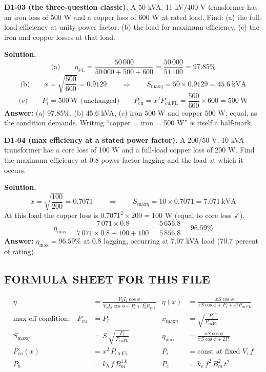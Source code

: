 \documentclass[11pt]{article}
\newcommand{\tagline}[1]{\textbf{\color{copper}#1}}
\begin{document}
\vspace{2pt}

\tagline{D1-03 (the three-question classic).} A 50 kVA, 11 kV/400 V transformer has an iron loss of 500 W and a copper loss of 600 W at rated load. Find: (a) the full-load efficiency at unity power factor, (b) the load for maximum efficiency, (c) the iron and copper losses at that load.

\textbf{Solution.}
\[
\text{(a)}\qquad
\eta_{\text{FL}} = \frac{50\,000}{50\,000 + 500 + 600} = \frac{50\,000}{51\,100} = 97.85\%
\]
\[
\text{(b)}\qquad
x = \sqrt{\frac{500}{600}} = 0.9129
\qquad\Longrightarrow\qquad
S_{\text{max}\eta} = 50 \times 0.9129 = 45.6\ \text{kVA}
\]
\[
\text{(c)}\qquad
P_i = 500\ \text{W (unchanged)}
\qquad
P_{\text{cu}} = x^{2} P_{\text{cu,FL}} = \frac{500}{600} \times 600 = 500\ \text{W}
\]
\textbf{Answer:} (a) 97.85\%, (b) 45.6 kVA, (c) iron 500 W and copper 500 W: equal, as the condition demands. Writing ``copper = iron = 500 W'' is itself a half-mark.

\vspace{2pt}

\tagline{D1-04 (max efficiency at a stated power factor).} A 200/50 V, 10 kVA transformer has a core loss of 100 W and a full-load copper loss of 200 W. Find the maximum efficiency at 0.8 power factor lagging and the load at which it occurs.

\textbf{Solution.}
\[
x = \sqrt{\frac{100}{200}} = 0.7071
\qquad\Longrightarrow\qquad
S_{\text{max}\eta} = 10 \times 0.7071 = 7.071\ \text{kVA}
\]
At this load the copper loss is $0.7071^{2} \times 200 = 100$ W (equal to core loss $\checkmark$).
\[
\eta_{\text{max}} = \frac{7\,071 \times 0.8}{7\,071 \times 0.8 + 100 + 100} = \frac{5\,656.8}{5\,856.8} = 96.59\%
\]
\textbf{Answer:} $\eta_{\text{max}} = 96.59\%$ at 0.8 lagging, occurring at 7.07 kVA load (70.7 percent of rating).

\hrulefill
\subsection*{\color{copper}FORMULA SHEET FOR THIS FILE}
\begin{align*}
\eta &= \frac{V_2 I_2 \cos\phi}{V_2 I_2 \cos\phi + P_i + I_2^{2} R_{\text{eq2}}}
& \eta(x) &= \frac{x S \cos\phi}{x S \cos\phi + P_i + x^{2} P_{\text{cu,FL}}} \\[4pt]
\text{max-eff condition:}\quad P_{\text{cu}} &= P_i
& x_{\text{max}\eta} &= \sqrt{\frac{P_i}{P_{\text{cu,FL}}}} \\[4pt]
S_{\text{max}\eta} &= S\,\sqrt{\frac{P_i}{P_{\text{cu,FL}}}}
& \eta_{\text{max}} &= \frac{x S \cos\phi}{x S \cos\phi + 2 P_i} \\[4pt]
P_{\text{cu}}(x) &= x^{2}\, P_{\text{cu,FL}}
& P_i &= \text{const at fixed } V, f \\[4pt]
P_h &= k_h\, f\, B_m^{1.6}
& P_e &= k_e\, f^{2}\, B_m^{2}\, t^{2}
\end{align*}
\end{document}
